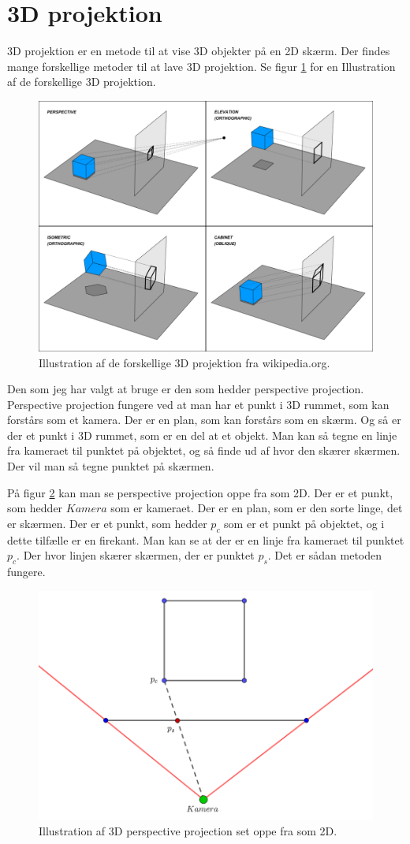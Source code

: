 \documentclass{article}
\begin{document}
\section{3D projektion}
3D projektion er en metode til at vise 3D objekter på en 2D skærm. 
Der findes mange forskellige metoder til at lave 3D projektion.
Se figur \ref{fig:3dpro} for en Illustration af de forskellige 3D projektion.

\begin{figure}[h]
\centering
\includegraphics[width=0.7\linewidth]{3dpro.png}
\caption{\label{fig:3dpro}Illustration af de forskellige 3D projektion fra wikipedia.org.}
\end{figure}

Den som jeg har valgt at bruge er den som hedder perspective projection.
Perspective projection fungere ved at man har et punkt i 3D rummet, som kan forstårs som et kamera.
Der er en plan, som kan forstårs som en skærm.
Og så er der et punkt i 3D rummet, som er en del at et objekt.
Man kan så tegne en linje fra kameraet til punktet på objektet, og så finde ud af hvor den skærer skærmen.
Der vil man så tegne punktet på skærmen.

På figur \ref{fig:plan} kan man se perspective projection oppe fra som 2D.
Der er et punkt, som hedder $Kamera$ som er kameraet. 
Der er en plan, som er den sorte linge, det er skærmen.
Der er et punkt, som hedder $p_{c}$ som er et punkt på objektet, og i dette tilfælle er en firekant.
Man kan se at der er en linje fra kameraet til punktet $p_{c}$.
Der hvor linjen skærer skærmen, der er punktet $p_{s}$.
Det er sådan metoden fungere.

\begin{figure}[h]
\centering
\includegraphics[width=0.7\linewidth]{plan.png}
\caption{\label{fig:plan}Illustration af 3D perspective projection set oppe fra som 2D.}
\end{figure}
\end{document}
